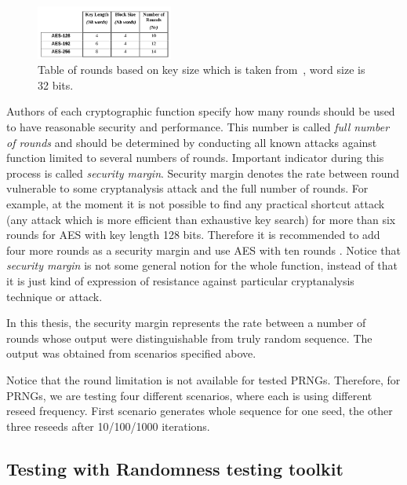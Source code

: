 \documentclass[
    digital,    %
    oneside,    %
    color,
    11pt,
    nocover,
    notable,
    nolof,
    nolot,
    final
]{fithesis3}
\renewcommand\_{\textunderscore\allowbreak}
\begin{document}
\begin{figure}[h]
	\centering
	\includegraphics[width=0.4\textwidth]{./images/pictures/FIPS197-Nr-table.png}
	\caption{Table of rounds based on key size which is taken from~\cite{FIPS-197}, word size is 32 bits.}
	\label{fig:fips197-rounds}
\end{figure}

Authors of each cryptographic function specify how many rounds should be used to have reasonable security and performance. This number is called \textit{full number of rounds} and should be determined by conducting all known attacks against function limited to several numbers of rounds. Important indicator during this process is called \textit{security margin}. Security margin denotes the rate between round vulnerable to some cryptanalysis attack and the full number of rounds. For example, at the moment it is not possible to find any practical shortcut attack (any attack which is more efficient than exhaustive key search) for more than six rounds for AES with key length 128 bits. Therefore it is recommended to add four more rounds as a security margin and use AES with ten rounds \cite{daemen1999aes}. Notice that \textit{security margin} is not some general notion for the whole function, instead of that it is just kind of expression of resistance against particular cryptanalysis technique or attack.

In this thesis, the security margin represents the rate between a number of rounds whose output were distinguishable from truly random sequence. The output was obtained from scenarios specified above.

Notice that the round limitation is not available for tested PRNGs. Therefore, for PRNGs, we are testing four different scenarios, where each is using different reseed frequency. First scenario generates whole sequence for one seed, the other three reseeds after 10/100/1000 iterations.  


\subsection{Testing with Randomness testing toolkit}
\end{document}

